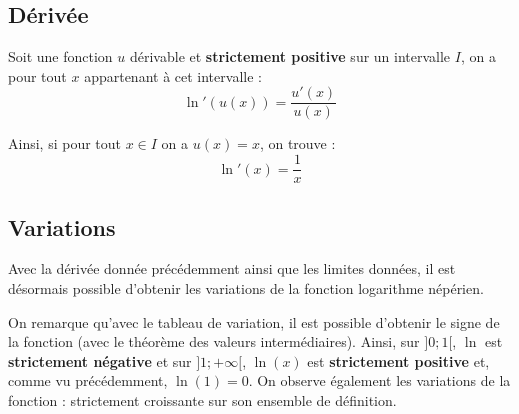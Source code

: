 	\subsection{Dérivée}

	\begin{formula}
		Soit une fonction $u$ dérivable et \textbf{strictement positive} sur un intervalle $I$, on a pour tout $x$ appartenant à cet intervalle :
		\[ \ln'(u(x)) = \frac{u'(x)}{u(x)} \]
	\end{formula}

	\begin{formula}[Dérivée]
		Ainsi, si pour tout $x \in I$ on a $u(x) = x$, on trouve :
		\[ \ln'(x) = \frac{1}{x} \]
	\end{formula}

	\subsection{Variations}

	Avec la dérivée donnée précédemment ainsi que les limites données, il est désormais possible d'obtenir les variations de la fonction logarithme népérien.

	\begin{formula}
		\contentwidth[big]

		On remarque qu'avec le tableau de variation, il est possible d'obtenir le signe de la fonction (avec le théorème des valeurs
		intermédiaires).
		\newpar
		Ainsi, sur $]0;1[$, $\ln$ est \textbf{strictement négative} et sur $]1;+\infty[$,
		$\ln(x)$ est \textbf{strictement positive} et, comme vu précédemment, $\ln(1) = 0$.
		\newpar
		On observe également les variations de la fonction : strictement croissante sur son ensemble de définition.
	\end{formula}

